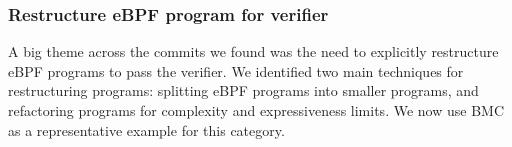 \subsubsection{Restructure eBPF program for verifier}
\label{motivation:restructure}
A big theme across the commits we found was the need to explicitly restructure eBPF programs to pass the verifier.
We identified two main techniques for restructuring programs: splitting eBPF programs into smaller programs, and refactoring programs for complexity and expressiveness limits.
We now use BMC\cite{BMC} as a representative example for this category.


